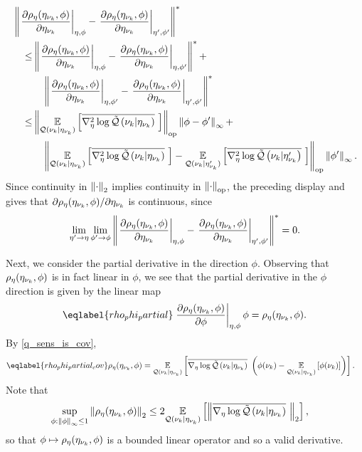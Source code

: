 %
\begin{align*}
%
\MoveEqLeft
%
\norm{\fracat{\partial \rho_\eta(\etanuk, \phi)}{\partial \etanuk}{\eta, \phi} -
      \fracat{\partial \rho_\eta(\etanuk, \phi)}{\partial \etanuk}{\eta', \phi'}
      }^* \\ \le
%
& \norm{\fracat{\partial \rho_\eta(\etanuk, \phi)}{\partial \etanuk}{\eta, \phi} -
        \fracat{\partial \rho_\eta(\etanuk, \phi)}{\partial \etanuk}{\eta, \phi'}
    }^* + \\&\quad
\norm{\fracat{\partial \rho_\eta(\etanuk, \phi)}{\partial \etanuk}{\eta, \phi'} -
      \fracat{\partial \rho_\eta(\etanuk, \phi)}{\partial \etanuk}{\eta', \phi'}
    }^* \\ \le
%
& \normop{
    \expect{\q(\nuk \vert \etanuk)}
           {\lqhessbar{\nuk \vert \etanuk}}
    } \norminf{\phi - \phi'} + \\&\quad
\normop{
    \expect{\q(\nuk \vert \etanuk)}{\lqhessbar{\nuk \vert \etanuk}} -
    \expect{\q(\nuk \vert \etanuk')}{\lqhessbar{\nuk \vert \etanuk'}}
  } \norminf{\phi'}.
%
\end{align*}
%
Since continuity in $\left\Vert\cdot\right\Vert_2$ implies continuity in $\left\Vert\cdot\right\Vert_{\mathrm{op}}$,
the preceding display and  gives that
$\partial \rho_\eta(\eta_{\nu_{k}}, \phi) / \partial \eta_{\nu_{k}}$ is continuous,
since
%
\begin{align*}
%
\lim_{\eta' \rightarrow \eta} \lim_{\phi' \rightarrow \phi}
\norm{\fracat{\partial \rho_\eta(\etanuk, \phi)}{\partial \etanuk}{\eta, \phi} -
      \fracat{\partial \rho_\eta(\etanuk, \phi)}{\partial \etanuk}{\eta', \phi'}
      }^* = 0.
%
\end{align*}

Next, we consider the partial derivative in the direction $\phi$.  Observing
that $\rho_\eta(\eta_{\nu_{k}}, \phi)$ is in fact linear in $\phi$, we see that the
partial derivative in the $\phi$ direction is given by the linear map
%
\begin{align}\eqlabel{rho_phi_partial}
%
\fracat{\partial \rho_\eta(\etanuk, \phi)}
       {\partial \phi}{\eta, \phi} \phi =
    \rho_\eta(\etanuk, \phi).
%
\end{align}
%
By  \eqref{q_sens_is_cov},
%
\begin{align}\eqlabel{rho_phi_partial_cov}
%
\rho_\eta(\etanuk, \phi) ={}&
\expect{\q(\nuk \vert \etanuk)}
       {\lqgradbar{\nuk \vert \etanuk} \left(
        \phi(\nuk) - \expect{\q(\nuk \vert \etanuk)}{\phi(\nuk)}
       \right)
       }.
%
\end{align}
%
Note that
%
\begin{align*}
%
\sup_{\phi: \norminf{\phi} \le 1} \norm{\rho_\eta(\etanuk, \phi)}_2 \le{}&
    2 \expect{\q(\nuk \vert \etanuk)}
             {\norm{\lqgradbar{\nuk \vert \etanuk}}_2
             },
%
\end{align*}
%
so that $\phi \mapsto \rho_\eta(\eta_{\nu_{k}}, \phi)$ is a bounded linear operator and
so a valid derivative.

